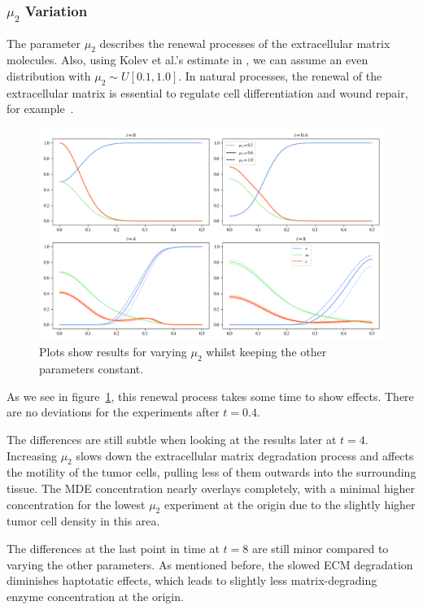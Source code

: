 \subsubsection*{$\mu_2$ Variation}
The parameter $\mu_2$ describes the renewal processes of the extracellular matrix molecules. Also, using Kolev et al.'s estimate in \cite{Kolev2010}, we can assume an even distribution with $\mu_2 \sim U[0.1, 1.0]$. In natural processes, the renewal of the extracellular matrix is essential to regulate cell differentiation and wound repair, for example~\cite{Lu2011-yt}.
\begin{figure}[h!]
 \centering
 \includegraphics[width=\textwidth]{resources/images/prolif_mu_2_variation.png}
 \caption{Plots show results for varying $\mu_2$ whilst keeping the other parameters constant.}
 \label{fig:prolif_mu_2_variation}
\end{figure}
As we see in figure~\ref{fig:prolif_mu_2_variation}, this renewal process takes some time to show effects. There are no deviations for the experiments after $t=0.4$.

The differences are still subtle when looking at the results later at $t=4$. Increasing $\mu_2$ slows down the extracellular matrix degradation process and affects the motility of the tumor cells, pulling less of them outwards into the surrounding tissue. The MDE concentration nearly overlays completely, with a minimal higher concentration for the lowest $\mu_2$ experiment at the origin due to the slightly higher tumor cell density in this area.

The differences at the last point in time at $t=8$ are still minor compared to varying the other parameters. As mentioned before, the slowed ECM degradation diminishes haptotatic effects, which leads to slightly less matrix-degrading enzyme concentration at the origin.

